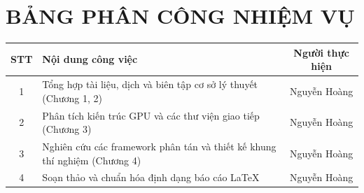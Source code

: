 \section*{BẢNG PHÂN CÔNG NHIỆM VỤ}

\begin{table}[H]
    \centering
    \begin{tabularx}{\textwidth}{|c|X|c|}
        \hline
        \textbf{STT} & \textbf{Nội dung công việc} & \textbf{Người thực hiện} \\
        \hline
        1 & Tổng hợp tài liệu, dịch và biên tập cơ sở lý thuyết (Chương 1, 2) & Nguyễn Hoàng \\
        \hline
        2 & Phân tích kiến trúc GPU và các thư viện giao tiếp (Chương 3) & Nguyễn Hoàng \\
        \hline
        3 & Nghiên cứu các framework phân tán và thiết kế khung thí nghiệm (Chương 4) & Nguyễn Hoàng \\
        \hline
        4 & Soạn thảo và chuẩn hóa định dạng báo cáo LaTeX & Nguyễn Hoàng \\
        \hline
    \end{tabularx}
\end{table}
\cleardoublepage